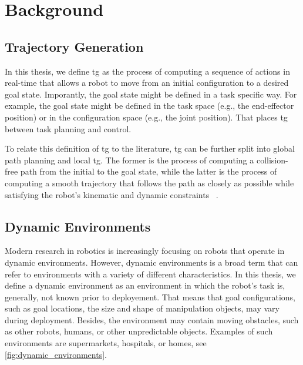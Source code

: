 ﻿\chapter{Background} %
\label{cha:background}



\newpage

\section{Trajectory Generation} %
\label{sec:trajectory_generation}

In this thesis, we define \ac{tg} as the process of
computing a sequence of actions in real-time that allows a
robot to move from an initial configuration to a desired
goal state. Imporantly, the goal state might be defined in a
task specific way. For example, the goal state might be
defined in the task space (e.g., the end-effector position)
or in the configuration space (e.g., the joint position).
That places \ac{tg} between task planning and control.

To relate this definition of \ac{tg} to the literature,
\ac{tg} can be further split into global path planning and
local \ac{tg}. The former is the process of
computing a collision-free path from the initial to the
goal state, while the latter is the process of computing a
smooth trajectory that follows the path as closely as
possible while satisfying the robot's kinematic and dynamic
constraints ~\cite{Rickert2014}.


\section{Dynamic Environments} %
\label{sec:dynamic_environments}

Modern research in robotics is increasingly focusing on
robots that operate in dynamic environments. However,
dynamic environments is a broad term that can refer to
environments with a variety of different characteristics. In
this thesis, we define a dynamic environment as an
environment in which the robot's task is, generally, not
known prior to deployement. That means that goal configurations, such as
goal locations, the size and shape of manipulation objects,
may vary during deployment. Besides, the environment may
contain moving obstacles, such as other robots, humans, or
other unpredictable objects. Examples of such environments
are supermarkets, hospitals, or homes, see \cref{fig:dynamic_environments}.


